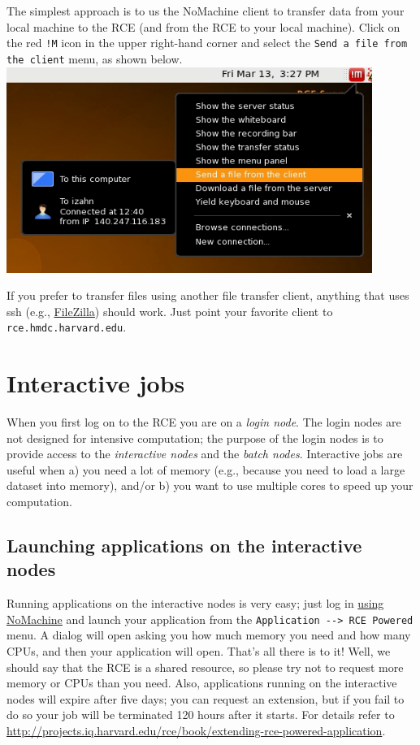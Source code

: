 \documentclass[11pt]{article}
\begin{document}
The simplest approach is to us the NoMachine client to transfer data from your local machine to the RCE (and from the RCE to your local machine). Click on the red \texttt{!M} icon in the upper right-hand corner and select the \texttt{Send a file from the client} menu, as shown below.
\includegraphics[width=.9\linewidth]{images/NoMachineMenu.png}

If you prefer to transfer files using another file transfer client, anything that uses ssh (e.g., \href{http://filezilla-project.org/}{FileZilla}) should work. Just point your favorite client to \texttt{rce.hmdc.harvard.edu}.

\section{Interactive jobs}
\label{sec-6}
When you first log on to the RCE you are on a \emph{login node}. The login nodes are not designed for intensive computation; the purpose of the login nodes is to provide access to the \emph{interactive nodes} and the \emph{batch nodes}. Interactive jobs are useful when a) you need a lot of memory (e.g., because you need to load a large dataset into memory), and/or b) you want to use multiple cores to speed up your computation.

\subsection{Launching applications on the interactive nodes}
\label{sec-6-1}
Running applications on the interactive nodes is very easy; just log in \hyperref[sec-2]{using NoMachine} and launch your application from the \texttt{Application -{}-> RCE Powered} menu. A dialog will open asking you how much memory you need and how many CPUs, and then your application will open. That's all there is to it! Well, we should say that the RCE is a shared resource, so please try not to request more memory or CPUs than you need. Also, applications running on the interactive nodes will expire after five days; you can request an extension, but if you fail to do so your job will be terminated 120 hours after it starts. For details refer to \url{http://projects.iq.harvard.edu/rce/book/extending-rce-powered-application}.
\end{document}
